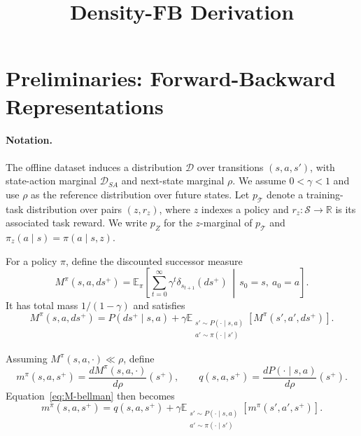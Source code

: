 \documentclass[11pt]{article}
\title{Density-FB Derivation}
\date{}
\begin{document}
\maketitle


\section{Preliminaries: Forward-Backward Representations}
\label{sec:preliminaries}

\paragraph{Notation.}
The offline dataset induces a distribution $\mathcal D$ over transitions $(s,a,s')$, with state-action marginal $\mathcal D_{SA}$ and next-state marginal $\rho$. We assume $0<\gamma<1$ and use $\rho$ as the reference distribution over future states. Let $p_{\mathcal T}$ denote a training-task distribution over pairs $(z,r_z)$, where $z$ indexes a policy and $r_z:\mathcal S\rightarrow\mathbb R$ is its associated task reward. We write $p_Z$ for the $z$-marginal of $p_{\mathcal T}$ and $\pi_z(a\mid s)=\pi(a\mid s,z)$.

For a policy $\pi$, define the discounted successor measure
\begin{equation}
    M^\pi(s,a,ds^+) = \mathbb E_\pi\left[\sum_{t=0}^{\infty}\gamma^t\delta_{s_{t+1}}(ds^+) \,\middle|\, s_0=s,\ a_0=a\right].
    \label{eq:M-definition}
\end{equation}
It has total mass $1/(1-\gamma)$ and satisfies
\begin{equation}
    M^\pi(s,a,ds^+) = P(ds^+\mid s,a) + \gamma\mathbb E_{\substack{s'\sim P(\cdot\mid s,a)\\a'\sim\pi(\cdot\mid s')}}\left[M^\pi(s',a',ds^+)\right].
    \label{eq:M-bellman}
\end{equation}

Assuming $M^\pi(s,a,\cdot)\ll\rho$, define
\[
    m^\pi(s,a,s^+) = \frac{dM^\pi(s,a,\cdot)}{d\rho}(s^+),
    \qquad
    q(s,a,s^+) = \frac{dP(\cdot\mid s,a)}{d\rho}(s^+).
\]
Equation~\eqref{eq:M-bellman} then becomes
\begin{equation}
    m^\pi(s,a,s^+) = q(s,a,s^+) + \gamma\mathbb E_{\substack{s'\sim P(\cdot\mid s,a)\\a'\sim\pi(\cdot\mid s')}}\left[m^\pi(s',a',s^+)\right].
    \label{eq:m-bellman}
\end{equation}
\end{document}
